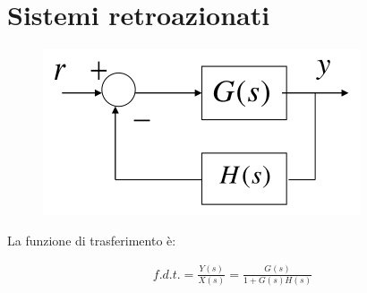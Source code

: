 \chapter{Sistemi retroazionati}

\begin{figure}[h!]
  \centering
  \includegraphics[scale=0.3]{./images/schema_blocchi.png}
\end{figure}

La funzione di trasferimento \`e:

\begin{align}
  f.d.t. = \frac{Y(s)}{X(s)} = \frac{G(s)}{1 + G(s)H(s)}
\end{align}


%



